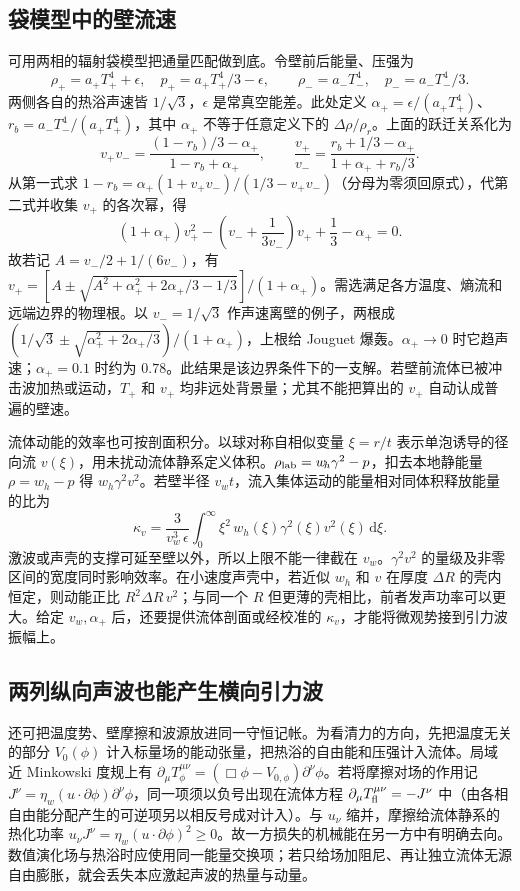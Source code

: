 \subsection{袋模型中的壁流速}

可用两相的辐射袋模型把通量匹配做到底。令壁前后能量、压强为
\[
 \rho_+=a_+T_+^4+\epsilon,\quad p_+=a_+T_+^4/3-\epsilon,\qquad
 \rho_-=a_-T_-^4,\quad p_-=a_-T_-^4/3 .
\]
两侧各自的热浴声速皆 $1/\sqrt3$，$\epsilon$ 是常真空能差。此处定义 $\alpha_+=\epsilon/(a_+T_+^4)$、$r_b=a_-T_-^4/(a_+T_+^4)$，其中 $\alpha_+$ 不等于任意定义下的 $\Delta\rho/\rho_r$。上面的跃迁关系化为
\[
 v_+v_-=\frac{(1-r_b)/3-\alpha_+}{1-r_b+\alpha_+},
 \qquad
 \frac{v_+}{v_-}=\frac{r_b+1/3-\alpha_+}{1+\alpha_++r_b/3}.
\]
从第一式求 $1-r_b=\alpha_+(1+v_+v_-)/(1/3-v_+v_-)$（分母为零须回原式），代第二式并收集 $v_+$ 的各次幂，得
\[
 (1+\alpha_+)v_+^2
 -\left(v_-+\frac1{3v_-}\right)v_+
 +\frac13-\alpha_+=0 .
\]
故若记 $A=v_-/2+1/(6v_-)$，有 $v_+=[A\pm\sqrt{A^2+\alpha_+^2+2\alpha_+/3-1/3}]/(1+\alpha_+)$。需选满足各方温度、熵流和远端边界的物理根。以 $v_-=1/\sqrt3$ 作声速离壁的例子，两根成 $(1/\sqrt3\pm\sqrt{\alpha_+^2+2\alpha_+/3})/(1+\alpha_+)$，上根给 Jouguet 爆轰。$\alpha_+\to0$ 时它趋声速；$\alpha_+=0.1$ 时约为 $0.78$。此结果是该边界条件下的一支解。若壁前流体已被冲击波加热或运动，$T_+$ 和 $v_+$ 均非远处背景量；尤其不能把算出的 $v_+$ 自动认成普遍的壁速。

流体动能的效率也可按剖面积分。以球对称自相似变量 $\xi=r/t$ 表示单泡诱导的径向流 $v(\xi)$，用未扰动流体静系定义体积。$\rho_{\rm lab}=w_{\!h}\gamma^2-p$，扣去本地静能量 $\rho=w_{\!h}-p$ 得 $w_{\!h}\gamma^2v^2$。若壁半径 $v_w t$，流入集体运动的能量相对同体积释放能量的比为
\[
 \kappa_v=\frac{3}{v_w^3\,\epsilon}
  \int_0^\infty \xi^2\,w_{\!h}(\xi)\gamma^2(\xi)v^2(\xi)\,\mathrm d\xi .
\]
激波或声壳的支撑可延至壁以外，所以上限不能一律截在 $v_w$。$\gamma^2v^2$ 的量级及非零区间的宽度同时影响效率。在小速度声壳中，若近似 $w_{\!h}$ 和 $v$ 在厚度 $\Delta R$ 的壳内恒定，则动能正比 $R^2\Delta R\,v^2$；与同一个 $R$ 但更薄的壳相比，前者发声功率可以更大。给定 $v_w,\alpha_+$ 后，还要提供流体剖面或经校准的 $\kappa_v$，才能将微观势接到引力波振幅上。

\subsection{两列纵向声波也能产生横向引力波}

还可把温度势、壁摩擦和波源放进同一守恒记帐。为看清力的方向，先把温度无关的部分 $V_0(\phi)$ 计入标量场的能动张量，把热浴的自由能和压强计入流体。局域近 Minkowski 度规上有 $\partial_\mu T_\phi^{\mu\nu}=(\Box\phi-V_{0,\phi})\partial^\nu\phi$。若将摩擦对场的作用记 $J^\nu=\eta_w(u\cdot\partial\phi)\partial^\nu\phi$，同一项须以负号出现在流体方程 $\partial_\mu T_{\rm fl}^{\mu\nu}=-J^\nu$ 中（由各相自由能分配产生的可逆项另以相反号成对计入）。与 $u_\nu$ 缩并，摩擦给流体静系的热化功率 $u_\nu J^\nu=\eta_w(u\cdot\partial\phi)^2\ge0$。故一方损失的机械能在另一方中有明确去向。数值演化场与热浴时应使用同一能量交换项；若只给场加阻尼、再让独立流体无源自由膨胀，就会丢失本应激起声波的热量与动量。

